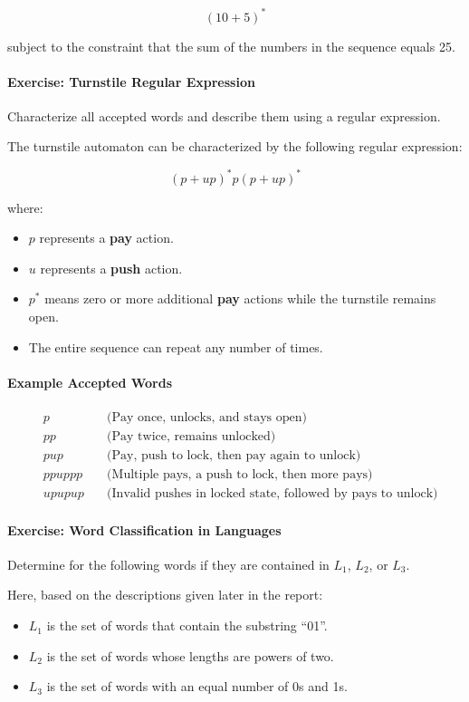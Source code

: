 \documentclass{article}
\theoremstyle{theorem}
\theoremstyle{definition}
\theoremstyle{remark}
\begin{document}
\[
(10 + 5)^*
\]

subject to the constraint that the sum of the numbers in the sequence equals 25.

\paragraph*{Exercise: Turnstile Regular Expression}

Characterize all accepted words and describe them using a regular expression.

The turnstile automaton can be characterized by the following regular expression:

\[
(p + u p)^* p (p + u p)^*
\]

where:
\begin{itemize}
    \item \( p \) represents a \textbf{pay} action.
    \item \( u \) represents a \textbf{push} action.
    \item \( p^* \) means zero or more additional \textbf{pay} actions while the turnstile remains open.
    \item The entire sequence can repeat any number of times.
\end{itemize}

\paragraph*{Example Accepted Words}
\begin{align*}
    & p &\quad \text{(Pay once, unlocks, and stays open)} \\
    & p p &\quad \text{(Pay twice, remains unlocked)} \\
    & p u p &\quad \text{(Pay, push to lock, then pay again to unlock)} \\
    & p p u p p p &\quad \text{(Multiple pays, a push to lock, then more pays)} \\
    & u p u p u p &\quad \text{(Invalid pushes in locked state, followed by pays to unlock)}
\end{align*}

\paragraph*{Exercise: Word Classification in Languages}

Determine for the following words if they are contained in \(L_1\), \(L_2\), or \(L_3\).

Here, based on the descriptions given later in the report:
\begin{itemize}
    \item \(L_1\) is the set of words that contain the substring ``01''.
    \item \(L_2\) is the set of words whose lengths are powers of two.
    \item \(L_3\) is the set of words with an equal number of 0s and 1s.
\end{itemize}
\end{document}
